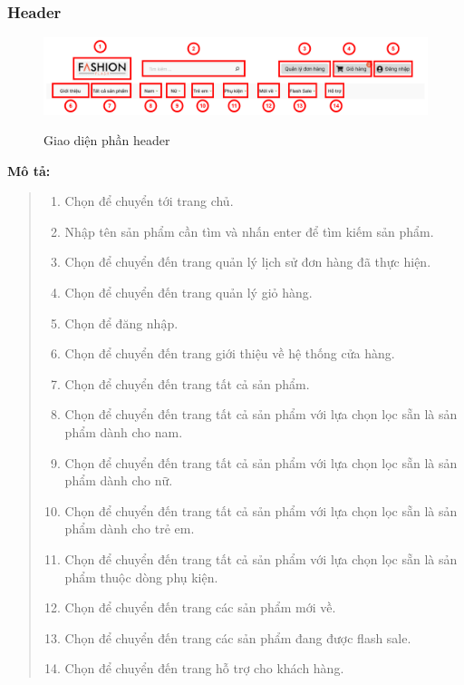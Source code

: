     \subsubsection{Header}
    \begin{figure}[!htp]
        \centering
        \includegraphics[width=5in]{img/UI/customer/header.png}
        \label{6}
        \newline
        \caption{Giao diện phần header}
    \end{figure}
    \textbf{Mô tả:}  
    \begin{quote}
        \begin{enumerate}
            \item Chọn để chuyển tới trang chủ.
            \item Nhập tên sản phẩm cần tìm và nhấn enter để tìm kiếm sản phẩm.
            \item Chọn để chuyển đến trang quản lý lịch sử đơn hàng đã thực hiện.
            \item Chọn để chuyển đến trang quản lý giỏ hàng.
            \item Chọn để đăng nhập.
            \item Chọn để chuyển đến trang giới thiệu về hệ thống cửa hàng.
            \item Chọn để chuyển đến trang tất cả sản phẩm.
            \item Chọn để chuyển đến trang tất cả sản phẩm với lựa chọn lọc sẵn là sản phẩm dành cho nam.
            \item Chọn để chuyển đến trang tất cả sản phẩm với lựa chọn lọc sẵn là sản phẩm dành cho nữ.
            \item Chọn để chuyển đến trang tất cả sản phẩm với lựa chọn lọc sẵn là sản phẩm dành cho trẻ em.
            \item Chọn để chuyển đến trang tất cả sản phẩm với lựa chọn lọc sẵn là sản phẩm thuộc dòng phụ kiện.
            \item Chọn để chuyển đến trang các sản phẩm mới về.
            \item Chọn để chuyển đến trang các sản phẩm đang được flash sale.
            \item Chọn để chuyển đến trang hỗ trợ cho khách hàng.
        \end{enumerate}
    \end{quote}
   
